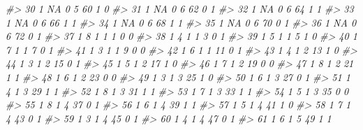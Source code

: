\documentclass[]{book}
\newenvironment{Shaded}{\begin{snugshade}}{\end{snugshade}}
\newcommand{\CommentTok}[1]{\textcolor[rgb]{0.56,0.35,0.01}{\textit{#1}}}
\begin{document}
\begin{Shaded}
\begin{Highlighting}[]
\CommentTok{#> 30      1        NA         0     5    60           1            0}
\CommentTok{#> 31      1        NA         0     6    62           0            1}
\CommentTok{#> 32      1        NA         0     6    64           1            1}
\CommentTok{#> 33      1        NA         0     6    66           1            1}
\CommentTok{#> 34      1        NA         0     6    68           1            1}
\CommentTok{#> 35      1        NA         0     6    70           0            1}
\CommentTok{#> 36      1        NA         0     6    72           0            1}
\CommentTok{#> 37      1         8         1     1     1           0            0}
\CommentTok{#> 38      1         4         1     1     3           0            1}
\CommentTok{#> 39      1         5         1     1     5           1            0}
\CommentTok{#> 40      1         7         1     1     7           0            1}
\CommentTok{#> 41      1         3         1     1     9           0            0}
\CommentTok{#> 42      1         6         1     1    11           0            1}
\CommentTok{#> 43      1         4         1     2    13           1            0}
\CommentTok{#> 44      1         3         1     2    15           0            1}
\CommentTok{#> 45      1         5         1     2    17           1            0}
\CommentTok{#> 46      1         7         1     2    19           0            0}
\CommentTok{#> 47      1         8         1     2    21           1            1}
\CommentTok{#> 48      1         6         1     2    23           0            0}
\CommentTok{#> 49      1         3         1     3    25           1            0}
\CommentTok{#> 50      1         6         1     3    27           0            1}
\CommentTok{#> 51      1         4         1     3    29           1            1}
\CommentTok{#> 52      1         8         1     3    31           1            1}
\CommentTok{#> 53      1         7         1     3    33           1            1}
\CommentTok{#> 54      1         5         1     3    35           0            0}
\CommentTok{#> 55      1         8         1     4    37           0            1}
\CommentTok{#> 56      1         6         1     4    39           1            1}
\CommentTok{#> 57      1         5         1     4    41           1            0}
\CommentTok{#> 58      1         7         1     4    43           0            1}
\CommentTok{#> 59      1         3         1     4    45           0            1}
\CommentTok{#> 60      1         4         1     4    47           0            1}
\CommentTok{#> 61      1         6         1     5    49           1            1}

\end{Highlighting}
\end{Shaded}
\end{document}
